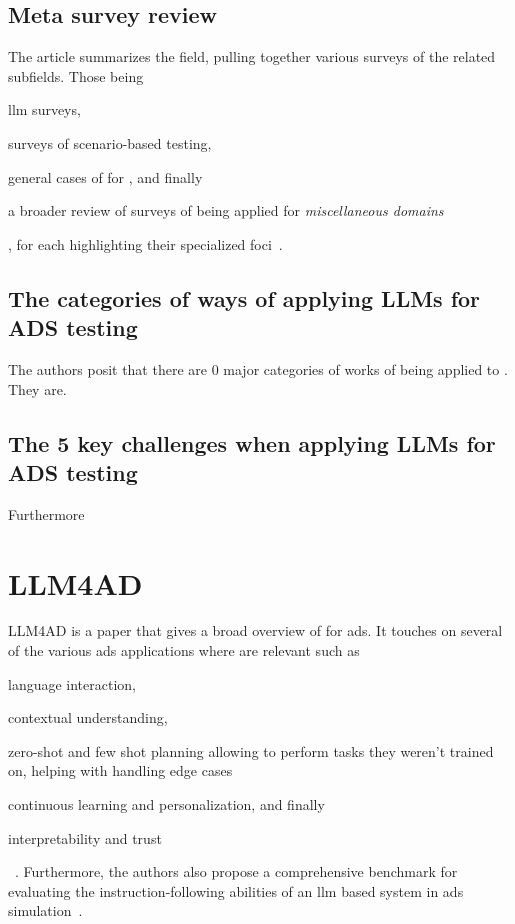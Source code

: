 \subsection{Meta survey review}

The article summarizes the field, pulling together various surveys of the
related subfields. Those being \begin{inparaenum}
    \item \acrshort{llm} surveys,
    \item surveys of scenario-based testing,
    \item general cases of  for , and finally
    \item a broader review of surveys of  being applied for
    \textit{miscellaneous domains}
\end{inparaenum},
for each highlighting their specialized
foci~\cite[2]{surveyLLMScenarioBasedTesting}.

\subsection{The categories of ways of applying LLMs for ADS testing}

The authors posit that there are \num{0} major categories of works of
 being applied to . They are.

\subsection{The \num{5} key challenges when applying LLMs for ADS testing}

Furthermore


\section{LLM4AD}

LLM4AD is a paper that gives a broad overview of  for \acrlong{ads}. It touches on
several of the various \acrshort{ads} applications where  are relevant such as
\begin{inparaenum}
    \item language interaction,
    \item contextual understanding,
    \item zero-shot and few shot planning allowing  to perform tasks they weren't trained
    on, helping with handling edge cases
    \item continuous learning and personalization, and finally
    \item interpretability and trust \end{inparaenum}~\cite[2]{LLM4AD}. Furthermore, the authors
also propose a comprehensive benchmark for evaluating the instruction-following abilities of an
\acrshort{llm} based system in \acrshort{ads} simulation~\cite[1]{LLM4AD}.
